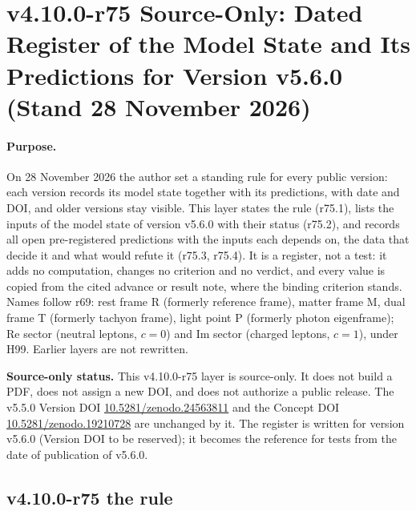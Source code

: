 
\clearpage
\section*{v4.10.0-r75 Source-Only: Dated Register of the Model State and Its Predictions for Version v5.6.0 (Stand 28 November 2026)}
\label{sec:v4100-r75-prediction-register}

\paragraph{Purpose.}
On 28 November 2026 the author set a standing rule for every public version: each version records its model state together with its
predictions, with date and DOI, and older versions stay visible.  This layer states the rule (r75.1), lists the inputs of the model state of
version v5.6.0 with their status (r75.2), and records all open pre-registered predictions with the inputs each depends on, the data that decide
it and what would refute it (r75.3, r75.4).  It is a register, not a test: it adds no computation, changes no criterion and no verdict, and
every value is copied from the cited advance or result note, where the binding criterion stands.  Names follow r69: rest frame R (formerly
reference frame), matter frame M, dual frame T (formerly tachyon frame), light point P (formerly photon eigenframe); Re sector (neutral
leptons, \(c=0\)) and Im sector (charged leptons, \(c=1\)), under H99.  Earlier layers are not rewritten.

\noindent\textbf{Source-only status.}
This v4.10.0-r75 layer is source-only.  It does not build a PDF, does not assign a new DOI,
and does not authorize a public release.  The v5.5.0 Version DOI
\href{https://doi.org/10.5281/zenodo.24563811}{10.5281/zenodo.24563811} and the Concept DOI
\href{https://doi.org/10.5281/zenodo.19210728}{10.5281/zenodo.19210728} are unchanged by it.  The register is written for version v5.6.0
(Version DOI to be reserved); it becomes the reference for tests from the date of publication of v5.6.0.

\subsection*{v4.10.0-r75 the rule}
\label{subsec:v4100-r75-rule}

